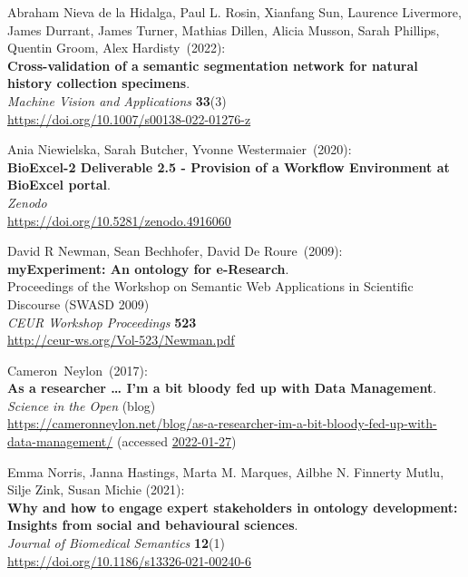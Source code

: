 \begin{thebibliography}{9}
Abraham Nieva de la Hidalga, Paul L. Rosin, Xianfang Sun, Laurence Livermore, James Durrant, James Turner, Mathias Dillen, Alicia Musson, Sarah Phillips, Quentin Groom, Alex Hardisty~(2022):\\
\textbf{Cross-validation of a semantic segmentation network for natural history collection specimens}.\\
\emph{Machine Vision and Applications} \textbf{33}(3)\\
\url{https://doi.org/10.1007/s00138-022-01276-z}

Ania Niewielska, Sarah Butcher, Yvonne Westermaier~(2020):\\
\textbf{BioExcel-2 Deliverable 2.5 - Provision of a Workflow Environment
at BioExcel portal}.\\
\emph{Zenodo}\\
\url{https://doi.org/10.5281/zenodo.4916060}

David R Newman, Sean Bechhofer, David De Roure~(2009):\\
\textbf{myExperiment: An ontology for e-Research}.\\
Proceedings of the Workshop on Semantic Web Applications in
Scientific Discourse (SWASD 2009)\\
\emph{CEUR Workshop Proceedings} \textbf{523}\\
\url{http://ceur-ws.org/Vol-523/Newman.pdf}

Cameron~Neylon~(2017):\\
\textbf{As a researcher \ldots{} I'm a bit bloody fed up with Data
Management}.\\
\emph{Science in the Open} (blog)\\
\url{https://cameronneylon.net/blog/as-a-researcher-im-a-bit-bloody-fed-up-with-data-management/}
(accessed \href{https://web.archive.org/web/20220127113116/https://cameronneylon.net/blog/as-a-researcher-im-a-bit-bloody-fed-up-with-data-management/}{2022-01-27})

Emma Norris, Janna Hastings, Marta M. Marques, Ailbhe N. Finnerty Mutlu,
Silje Zink, Susan Michie (2021): \\
\textbf{Why and how to engage expert
stakeholders in ontology development: Insights from social and
behavioural sciences}. \\
\emph{Journal of Biomedical Semantics} \textbf{12}(1) \\
\url{https://doi.org/10.1186/s13326-021-00240-6}


\end{thebibliography}
